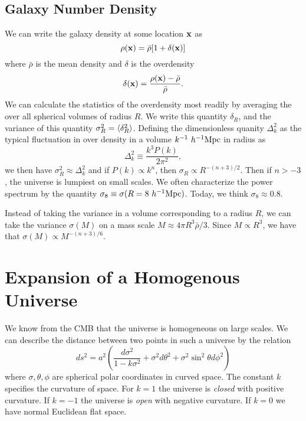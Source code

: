 \documentclass[]{article}
\begin{document}
\subsection{Galaxy Number Density}

We can write the galaxy density at some location $\mathbf{x}$ as
\begin{equation}
\rho(\mathbf{x}) = \bar{\rho}[1+\delta(\mathbf{x})]
\end{equation}
\noindent
where $\bar{\rho}$ is the mean density and $\delta$ is the overdensity
\begin{equation}
\delta(\mathbf{x}) = \frac{\rho(\mathbf{x}) - \bar{\rho}}{\bar{\rho}}.
\end{equation}
We can calculate the statistics of the overdensity most readily
by averaging the over all spherical volumes of radius $R$.
We write this quantity $\delta_R$, and the variance of 
this quantity $\sigma_R^2 = \langle\delta_R^2\rangle$.  Defining
the dimensionless quanity $\Delta_k^2$ as the typical
fluctuation in over density in a volume $k^{-1}~h^{-1}\mathrm{Mpc}$
in radius as
\begin{equation}
\Delta_k^2 \equiv \frac{k^3 P(k)}{2\pi^2},
\end{equation}
\noindent
we then have $\sigma_R^2 \approx \Delta_k^2$ and if
$P(k)\propto k^n$, then $\sigma_R \propto R^{-(n+3)/2}$.
Then if $n>-3$, the universe is lumpiest on small scales.
We often characterize the power spectrum by the 
quantity $\sigma_8\equiv\sigma(R=8~h^{-1}\mathrm{Mpc})$.  Today, we think 
$\sigma_8\approx0.8$.

Instead of taking the variance in a volume corresponding to
a radius $R$, we can take the variance $\sigma(M)$ on a mass scale
$M \approx 4\pi R^3  \bar{\rho}/3$.  Since $M \propto R^3$, we
have that $\sigma(M) \propto M^{-(n+3)/6}$.

\section{Expansion of a Homogenous Universe}

We know from the CMB that the universe is homogeneous on
large scales.  We can describe the distance between two
points in such a universe by the relation
\begin{equation}
ds^2 = a^2 \left( \frac{d\sigma^2}{1-k\sigma^2} + \sigma^2 d\theta^2 + \sigma^2 \sin^2 \theta d\phi^2\right)
\end{equation}
\noindent
where $\sigma, \theta, \phi$ are spherical polar coordinates in curved space.
The constant $k$ specifies the curvature of space.  For $k=1$ the universe
is {\it closed} with positive curvature.  If $k=-1$ the universe is
{\it open} with negative curvature.  If $k=0$ we have normal Euclidean
flat space.
\end{document}
